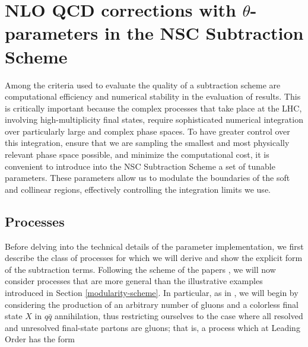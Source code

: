 \documentclass[a4paper, 12pt]{book}
\begin{document}
 

\clearpage

\chapter{NLO QCD corrections with $\theta$-parameters in the NSC Subtraction Scheme}
\label{NSC-SS-parameters}
Among the criteria used to evaluate the quality of a subtraction scheme are computational efficiency and numerical stability in the evaluation of results. This is critically important because the complex processes that take place at the LHC, involving high-multiplicity final states, require sophisticated numerical integration over particularly large and complex phase spaces. To have greater control over this integration, ensure that we are sampling the smallest and most physically relevant phase space possible, and minimize the computational cost, it is convenient to introduce into the NSC Subtraction Scheme a set of tunable parameters. These parameters allow us to modulate the boundaries of the soft and collinear regions, effectively controlling the integration limits we use.

\section{Processes}
Before delving into the technical details of the parameter implementation, we first describe the class of processes for which we will derive and show the explicit form of the subtraction terms. Following the scheme of the papers \cite{Devoto:2023rpv,Devoto:2025kin}, we will now consider processes that are more general than the illustrative examples introduced in Section \ref{modularity-scheme}. In particular, as in \cite{Devoto:2023rpv}, we will begin by considering the production of an arbitrary number of gluons and a colorless final state $X$ in $q \bar{q}$ annihilation, thus restricting ourselves to the case where all resolved and unresolved final-state partons are gluons; that is, a process which at Leading Order has the form
\end{document}
